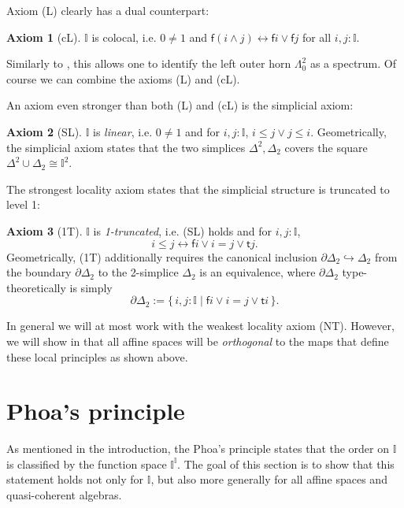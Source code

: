 \documentclass[12pt]{amsart}
\theoremstyle{definition}
\newtheorem*{axiom}{Axiom}
\newcommand{\mbb}[1]{\mathbb{#1}}
\newcommand{\I}{\mbb I}
\newcommand{\ms}[1]{\mathsf{#1}}
\newcommand{\scomp}[2]{\{\,#1\mid#2\,\}}
\newcommand{\hook}{\hookrightarrow}
\newcommand{\eq}{\leftrightarrow}
\begin{document}
Axiom (L) clearly has a dual counterpart:

\begin{axiom}[cL]\label{ax:cL}
  $\I$ is colocal, i.e. $0 \neq 1$ and $\ms f(i \wedge j) \eq \ms fi \vee \ms fj$ for all $i,j : \I$.
\end{axiom}

Similarly to , this allows one to identify the left outer horn $\Lambda^2_0$ as a spectrum. Of course we can combine the axioms (L) and (cL). 

An axiom even stronger than both (L) and (cL) is the simplicial axiom:

\begin{axiom}[SL]\label{ax:SL}
  $\I$ is \emph{linear}, i.e. $0 \neq 1$ and for $i,j : \I$, $i \le j \vee j \le i$. Geometrically, the simplicial axiom states that the two simplices $\Delta^2,\Delta_2$ covers the square $\Delta^2 \cup \Delta_2 \cong \I^2$.
\end{axiom}

The strongest locality axiom states that the simplicial structure is truncated to level 1:

\begin{axiom}[1T]\label{ax:1T}
  $\I$ is \emph{1-truncated}, i.e. (SL) holds and for $i,j : \I$, 
  \[ i \le j \eq \ms fi \vee i = j \vee \ms tj. \]
  Geometrically, (1T) additionally requires the canonical inclusion $\partial\Delta_2 \hook \Delta_2$ from the boundary $\partial\Delta_2$ to the 2-simplice $\Delta_2$ is an equivalence, where $\partial\Delta_2$ type-theoretically is simply
  \[ \partial\Delta_2 := \scomp{i,j : \I}{\ms fi \vee i = j \vee \ms ti}. \]
\end{axiom}

In general we will at most work with the weakest locality axiom (NT). However, we will show in  that all affine spaces will be \emph{orthogonal} to the maps that define these local principles as shown above.


\section{Phoa's principle}\label{sec:intposet}

As mentioned in the introduction, the Phoa's principle states that the order on $\I$ is classified by the function space $\I^\I$. The goal of this section is to show that this statement holds not only for $\I$, but also more generally for all affine spaces and quasi-coherent algebras.
\end{document}

